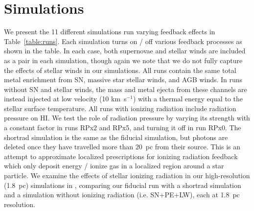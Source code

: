 \documentclass[twocolumn]{aastex62}
\newcommand{\HI}{HI}
\begin{document}
\section{Simulations}
\label{sec:runs}

We present the 11 different simulations run varying feedback effects in Table~\ref{table:runs}. Each simulation turns on / off various feedback processes as shown in the table. In each case, both supernovae and stellar winds are included as a pair in each simulation, though again we note that we do not fully capture the effects of stellar winds in our simulations. All runs contain the same total metal enrichment from SN, massive star stellar winds, and AGB winds. In runs without SN and stellar winds, the mass and metal ejecta from these channels are instead injected at low velocity (10 km~s$^{-1}$) with a thermal energy equal to the stellar surface temperature. All runs with ionizing radiation include radiation pressure on \HI. We test the role of radiation pressure by varying its strength with a constant factor in runs RPx2 and RPx5, and turning it off in run RPx0. The shortrad simulation is the same as the fiducial simulation, but photons are deleted once they have travelled more than 20~pc from their source. This is an attempt to approximate localized prescriptions for ionizing radiation feedback which only deposit energy / ionize gas in a localized region around a star particle. We examine the effects of stellar ionizing radiation in our high-resolution (1.8~pc) simulations in \cite{Emerick2018a}, comparing our fiducial run with a shortrad simulation and a simulation without ionizing radiation (i.e. SN+PE+LW), each at 1.8~pc resolution.

\end{document}
